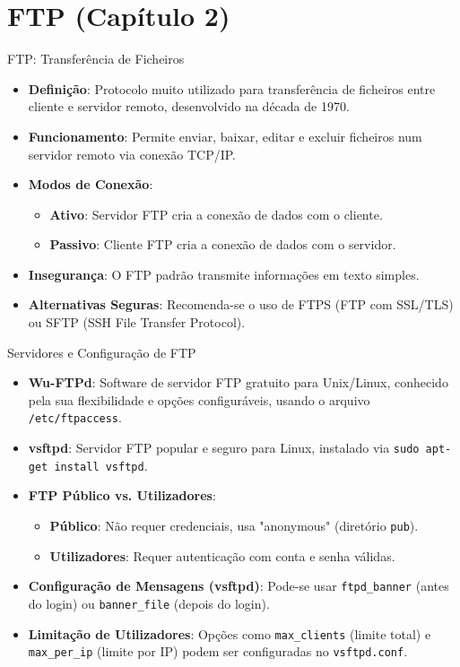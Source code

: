 \documentclass{beamer}
\begin{document}
	\section{FTP (Capítulo 2)}
	\begin{frame}{FTP: Transferência de Ficheiros}
		\begin{itemize}
			\item \textbf{Definição}: Protocolo muito utilizado para transferência de ficheiros entre cliente e servidor remoto, desenvolvido na década de 1970.
			\item \textbf{Funcionamento}: Permite enviar, baixar, editar e excluir ficheiros num servidor remoto via conexão TCP/IP.
			\item \textbf{Modos de Conexão}:
			\begin{itemize}
				\item \textbf{Ativo}: Servidor FTP cria a conexão de dados com o cliente.
				\item \textbf{Passivo}: Cliente FTP cria a conexão de dados com o servidor.
			\end{itemize}
			\item \textbf{Insegurança}: O FTP padrão transmite informações em texto simples.
			\item \textbf{Alternativas Seguras}: Recomenda-se o uso de FTPS (FTP com SSL/TLS) ou SFTP (SSH File Transfer Protocol).
		\end{itemize}
	\end{frame}
	
	\begin{frame}{Servidores e Configuração de FTP}
		\begin{itemize}
			\item \textbf{Wu-FTPd}: Software de servidor FTP gratuito para Unix/Linux, conhecido pela sua flexibilidade e opções configuráveis, usando o arquivo \texttt{/etc/ftpaccess}.
			\item \textbf{vsftpd}: Servidor FTP popular e seguro para Linux, instalado via \texttt{sudo apt-get install vsftpd}.
			\item \textbf{FTP Público vs. Utilizadores}:
			\begin{itemize}
				\item \textbf{Público}: Não requer credenciais, usa "anonymous" (diretório \texttt{pub}).
				\item \textbf{Utilizadores}: Requer autenticação com conta e senha válidas.
			\end{itemize}
			\item \textbf{Configuração de Mensagens (vsftpd)}: Pode-se usar \texttt{ftpd\_banner} (antes do login) ou \texttt{banner\_file} (depois do login).
			\item \textbf{Limitação de Utilizadores}: Opções como \texttt{max\_clients} (limite total) e \texttt{max\_per\_ip} (limite por IP) podem ser configuradas no \texttt{vsftpd.conf}.
		\end{itemize}
	\end{frame}
	
\end{document}
